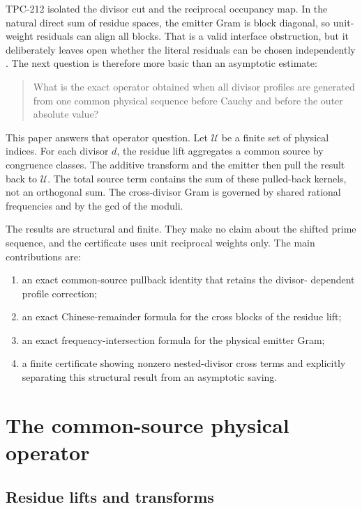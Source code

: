 \documentclass[11pt]{article}
\theoremstyle{definition}
\theoremstyle{remark}
\newcommand{\UU}{\mathcal U}
\begin{document}
TPC-212 isolated the divisor cut and the reciprocal occupancy map.  In the
natural direct sum of residue spaces, the emitter Gram is block diagonal, so
unit-weight residuals can align all blocks.  That is a valid interface
obstruction, but it deliberately leaves open whether the literal residuals
can be chosen independently \cite{WangTPC211,WangTPC212}.  The next question is therefore
more basic than an asymptotic estimate:

\begin{quote}
What is the exact operator obtained when all divisor profiles are generated
from one common physical sequence before Cauchy and before the outer absolute
value?
\end{quote}

This paper answers that operator question.  Let $\UU$ be a finite set of
physical indices.  For each divisor $d$, the residue lift aggregates a common
source by congruence classes.  The additive transform and the emitter then
pull the result back to $\UU$.  The total source term contains the sum of these
pulled-back kernels, not an orthogonal sum.  The cross-divisor Gram is governed
by shared rational frequencies and by the gcd of the moduli.

The results are structural and finite.  They make no claim about the shifted
prime sequence, and the certificate uses unit reciprocal weights only.  The
main contributions are:
\begin{enumerate}[leftmargin=2em]
 \item an exact common-source pullback identity that retains the divisor-
       dependent profile correction;
 \item an exact Chinese-remainder formula for the cross blocks of the residue
       lift;
 \item an exact frequency-intersection formula for the physical emitter Gram;
 \item a finite certificate showing nonzero nested-divisor cross terms and
       explicitly separating this structural result from an asymptotic saving.
\end{enumerate}

\section{The common-source physical operator}

\subsection{Residue lifts and transforms}
\end{document}
